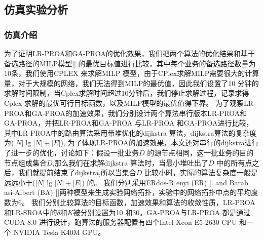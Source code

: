 \subsection{仿真实验分析}
\subsubsection {仿真介绍}
为了证明LR-PROA和GA-PROA的优化效果，我们把两个算法的优化结果和基于备选路径的MILP模型[] 的最优目标值进行比较，其中每个业务的备选路径数量为10条，我们使用CPLEX 来求解MILP 模型，由于CPlex求解MILP需要很大的计算量，对于大规模的网络，我们无法得到MILP的最优值，因此我们设置了10 分钟的求解时间限制，当Cplex求解时间超过10分钟后，我们停止求解过程，记录求得Cplex 求解的最优可行目标函数，以及MILP模型的最优值得下界。
为了观察LR-PROA和GA-PROA的加速效果，我们分别设计两个算法串行版本LR-PROA和GA-PROA，并把LR-PROA和GA-PROA 与LR-PROA 和GA-PROA进行比较，其中LR-PROA中的路由算法采用带堆优化的dijkstra 算法，dijkstra算法的复杂度为($|N|\lg |N| +|E|$), 为了体现LR-PROA的加速效果，本文还对串行的dijkstra进行了进一步的优化，讨论如下：假设一批业务$D$ 的源节点相同，这一批业务的目的节点组成集合$D$,那么我们在求解dijkstra 算法时，当最小堆吐出了$D$ 中的所有点之后，我们就提前结束了dijkstra,所以当集合$D$ 比较小时，实际的算法复杂度一般是远远小于($|N|\lg |N| +|E|$) 的。
我们分别采用ERdos-R enyi (ER) [] and Barab asi-Albert (BA) []两种模型来生成实验网络拓扑，实验中的网络拓扑中点的平均度数为6。 我们分别比较算法的目标函数，加速效果和算法的收敛性质，LR-PROA和LR-SROA中的$\delta$和$K$被分别设置为10 和30。GA-PROA与LR-PROA 都是通过CUDA 8.0 进行设计，跑算法的服务器配置有四个Intel Xeon E5-2630 CPU 和一个 NVIDIA Tesla K40M GPU。
